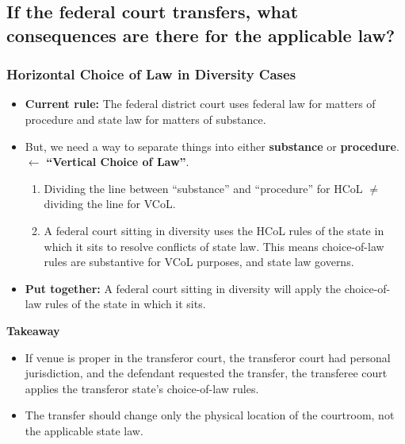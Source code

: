 \documentclass[11pt]{tex/lawoutline}
\begin{document}
\subsection{If the federal court transfers, what consequences are there for the applicable law?}

\subsubsection{Horizontal Choice of Law in Diversity Cases}

\begin{itemize}
    \item \textbf{Current rule:} The federal district court uses federal law for matters of procedure and state law for matters of substance.
    \item But, we need a way to separate things into either \textbf{substance} or \textbf{procedure}. $\leftarrow$ \textbf{``Vertical Choice of Law''}.
    \begin{enumerate}
        \item Dividing the line between ``substance'' and ``procedure'' for HCoL $\neq$ dividing the line for VCoL.
        \item A federal court sitting in diversity uses the HCoL rules of the state in which it sits to resolve conflicts of state law. This means choice-of-law rules are substantive for VCoL purposes, and state law governs.
    \end{enumerate}
    \item \textbf{Put together:} A federal court sitting in diversity will apply the choice-of-law rules of the state in which it sits.
\end{itemize}

{
\textbf{Takeaway}
\begin{itemize}
    \item If venue is proper in the transferor court, the transferor court had personal jurisdiction, and the defendant requested the transfer, the transferee court applies the transferor state's choice-of-law rules.
    \item The transfer should change only the physical location of the courtroom, not the applicable state law.
\end{itemize}
}
\end{document}
